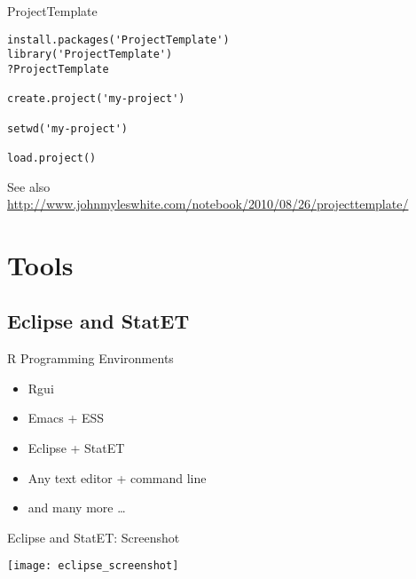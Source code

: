 \begin{frame}[containsverbatim]{ProjectTemplate}
\begin{verbatim}
install.packages('ProjectTemplate')
library('ProjectTemplate')
?ProjectTemplate

create.project('my-project')

setwd('my-project')

load.project()
\end{verbatim} 

{\tiny See also 
 \url{http://www.johnmyleswhite.com/notebook/2010/08/26/projecttemplate/}}
\end{frame}


  

\section{Tools}
\subsection{Eclipse and StatET}
\begin{frame}{R Programming Environments}
\begin{itemize}
\item Rgui
\item Emacs + ESS
\item Eclipse + StatET
\item Any text editor + command line
\item and many more \ldots
\end{itemize}
\end{frame}

\begin{frame}{Eclipse and StatET: Screenshot}
\begin{center}
\texttt{[image: eclipse\_screenshot]}
\end{center}
\end{frame}


